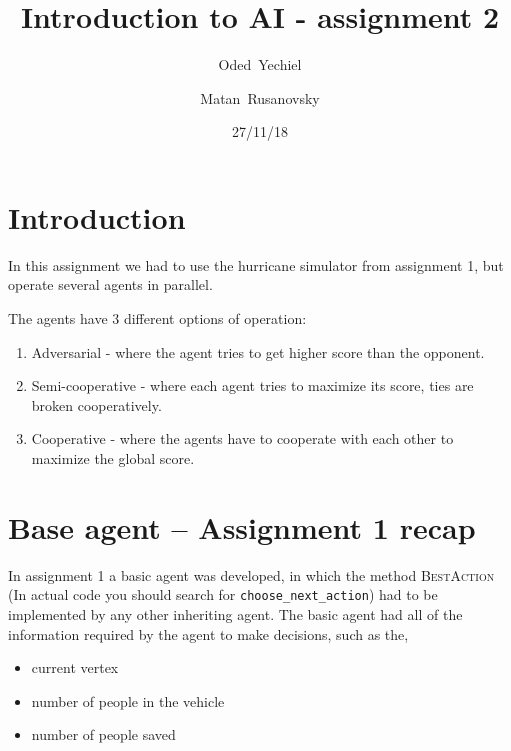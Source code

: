\documentclass{article}                     %
\begin{document}
	
	\title{Introduction to AI - assignment 2}
	
	
	\author{Oded~Yechiel         \and
		Matan~Rusanovsky
	}
	
	\date{27/11/18}
	
	\maketitle
	
	\section{Introduction}
	In this assignment we had to use the hurricane simulator from assignment 1, but operate several agents in parallel.
	
	The agents have 3 different options of operation:
	\begin{enumerate}
		\item Adversarial - where the agent tries to get higher score than the opponent.
		\item Semi-cooperative - where each agent tries to maximize its score, ties are broken cooperatively.
		\item Cooperative - where the agents have to cooperate with each other to maximize the global score.
	\end{enumerate}
	
	\section{Base agent -- Assignment 1 recap}
	In assignment 1 a basic agent was developed, in which the method \textsc{BestAction} (In actual code you should search for \texttt{choose\_next\_action}) had to be implemented by any other inheriting agent.
	The basic agent had all of the information required by the agent to make decisions, such as the,
	\begin{itemize}
		\item current vertex
		\item number of people in the vehicle
		\item number of people saved
	\end{itemize}
	
\end{document}
